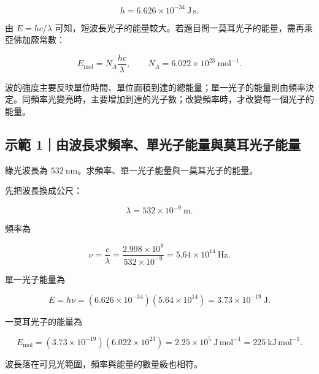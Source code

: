 \documentclass[11pt,a4paper]{article}
\begin{document}
\[
h=6.626\times10^{-34}\ \mathrm{J\,s}.
\]

由 \(E=hc/\lambda\) 可知，短波長光子的能量較大。若題目問一莫耳光子的能量，需再乘亞佛加厥常數：

\[
E_{\mathrm{mol}}=N_A\frac{hc}{\lambda},
\qquad
N_A=6.022\times10^{23}\ \mathrm{mol^{-1}}.
\]

波的強度主要反映單位時間、單位面積到達的總能量；單一光子的能量則由頻率決定。同頻率光變亮時，主要增加到達的光子數；改變頻率時，才改變每一個光子的能量。

\begin{HandoutWorkedExample}

\subsection{示範 1｜由波長求頻率、單光子能量與莫耳光子能量}\label{ux793aux7bc4-1ux7531ux6ce2ux9577ux6c42ux983bux7387ux55aeux5149ux5b50ux80fdux91cfux8207ux83abux8033ux5149ux5b50ux80fdux91cf}

綠光波長為 \(532\ \mathrm{nm}\)。求頻率、單一光子能量與一莫耳光子的能量。

先把波長換成公尺：

\[
\lambda=532\times10^{-9}\ \mathrm m.
\]

頻率為

\[
\nu=\frac{c}{\lambda}
=\frac{2.998\times10^8}{532\times10^{-9}}
=5.64\times10^{14}\ \mathrm{Hz}.
\]

單一光子能量為

\[
E=h\nu
=(6.626\times10^{-34})(5.64\times10^{14})
=3.73\times10^{-19}\ \mathrm J.
\]

一莫耳光子的能量為

\[
E_{\mathrm{mol}}
=(3.73\times10^{-19})(6.022\times10^{23})
=2.25\times10^5\ \mathrm{J\,mol^{-1}}
=225\ \mathrm{kJ\,mol^{-1}}.
\]

波長落在可見光範圍，頻率與能量的數量級也相符。

\end{HandoutWorkedExample}
\end{document}
